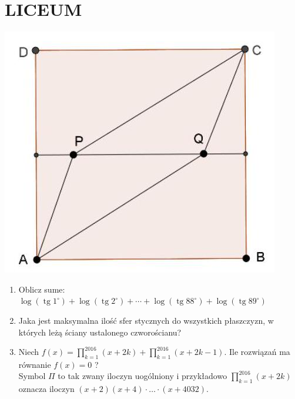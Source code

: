 \documentclass[10pt]{article}
\begin{document}
\section*{LICEUM}
\begin{center}
\includegraphics[max width=\textwidth]{2024_11_21_aff3155550b8fa0c078dg-1}
\end{center}

\begin{enumerate}
  \item Oblicz sume: \(\log \left(\operatorname{tg} 1^{\circ}\right)+\log \left(\operatorname{tg} 2^{\circ}\right)+\cdots+\log \left(\operatorname{tg} 88^{\circ}\right)+\log \left(\operatorname{tg} 89^{\circ}\right)\)
  \item Jaka jest maksymalna ilość sfer stycznych do wszystkich płaszczyzn, w których leżą ściany ustalonego czworościanu?
  \item Niech \(f(x)=\prod_{k=1}^{2016}(x+2 k)+\prod_{k=1}^{2016}(x+2 k-1)\). Ile rozwiązań ma równanie \(f(x)=0\) ?\\
Symbol \(\Pi\) to tak zwany iloczyn uogólniony i przykładowo \(\prod_{k=1}^{2016}(x+2 k)\) oznacza iloczyn \((x+2)(x+4) \cdot \ldots \cdot(x+4032)\).
\end{enumerate}
\end{document}
